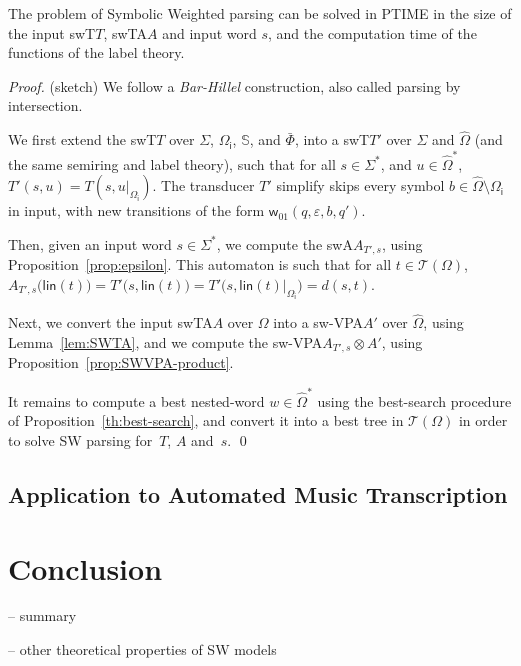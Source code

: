 \documentclass[runningheads]{llncs}
\newcommand{\T}{\mathcal{T}}
\newcommand{\Semiring}{\mathbb{S}}
\def\SWT{\textsf{swT}\xspace}
\def\SWA{\textsf{swA}\xspace}
\def\SWTA{\textsf{swTA}\xspace}
\def\SWVPA{\textsf{sw-VPA}\xspace}
\def\wei{\mathsf{w}}
\def\Omegai{{\Omega_\mathsf{i}}}
\newcommand{\lin}{\mathsf{lin}}
\begin{document}
\begin{proposition}
The problem of Symbolic Weighted  parsing 
can be solved in PTIME in the size of the input \SWT $T$, \SWTA $A$ %
and input word $s$, 
and the computation time of the functions of the label theory.
\end{proposition}
\begin{proof} (sketch)
We follow a \emph{Bar-Hillel} construction, also called parsing by intersection.

\noindent
We first extend the \SWT $T$ over $\Sigma$, $\Omegai$, $\Semiring$, and $\bar\Phi$, 
into a \SWT $T'$ over $\Sigma$ and $\hat\Omega$ (and the same semiring and label theory),
such that for all $s \in \Sigma^*$, and $u \in {\hat\Omega}^*$, 
$T'(s, u) = T(s, u|_{\Omegai})$. The transducer $T'$ simplify skips every symbol 
$b \in {\hat\Omega} \setminus \Omegai$ in input, 
with new transitions of the form $\wei_{01}(q, \varepsilon, b, q')$.

\noindent
Then, given an input word $s \in \Sigma^*$, 
we compute the \SWA $A_{T', s}$, using Proposition~\ref{prop:epsilon}.
This automaton is such that for all $t \in \T(\Omega)$, 
$A_{T', s}\bigl(\lin(t)\bigr) 
 = T'\bigl(s, \lin(t)\bigr) 
 = T'\bigl(s, \lin(t)|_{\Omegai}\bigr) 
 = d(s, t)$.

\noindent
Next, we convert the input \SWTA $A$ over $\Omega$
into a \SWVPA $A'$ over $\hat\Omega$, using Lemma~\ref{lem:SWTA}, 
and we compute the \SWVPA $A_{T', s} \otimes A'$, 
using Proposition~\ref{prop:SWVPA-product}.

\noindent
It remains to compute a best nested-word $w \in {\hat\Omega}^*$ 
using the best-search procedure of Proposition~\ref{th:best-search},
and convert it into a best tree in $\T(\Omega)$ in order to solve SW parsing
for~$T$, $A$ and~$s$.
\qed  
\end{proof}

\subsection{Application to Automated Music Transcription}
%




\section*{Conclusion}

\noindent
-- summary 

\noindent
-- other theoretical properties of SW models
\end{document}
